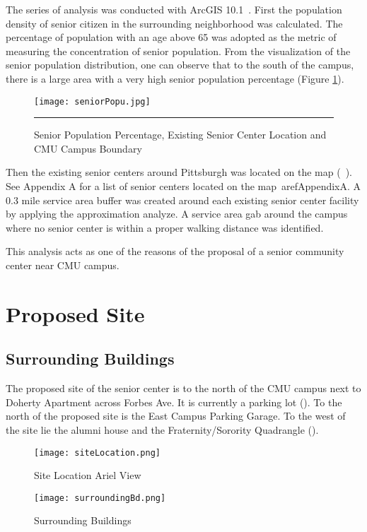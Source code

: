 The series of analysis was conducted with ArcGIS
10.1~\cite{ArcGIS}. First the population density of senior citizen in
the surrounding neighborhood was calculated. The percentage of
population with an age above 65 was adopted as the metric of measuring
the concentration of senior population\cite{WHO2015}. From the
visualization of the senior population distribution, one can observe
that to the south of the campus, there is a large area with a very
high senior population percentage (Figure \ref{fig:seniorPopu}).
\begin{figure}[htbp]
  \centering
  \texttt{[image: seniorPopu.jpg]}
  \rule{35em}{0.5pt}
  \caption[Near-campus Senior Population Density]{Senior Population
    Percentage, Existing Senior Center Location and CMU Campus
    Boundary}
  \label{fig:seniorPopu}
\end{figure}
Then the existing senior centers around Pittsburgh was located on the
map (~\cite{aging2013}). See Appendix A for a
list of senior centers located on the map~aref{AppendixA}. A 0.3 mile
service area buffer was created around each existing senior center
facility by applying the approximation analyze. A service area gab
around the campus where no senior center is within a proper walking
distance was identified.

This analysis acts as one of the reasons of the proposal of a senior
community center near CMU campus.

\section{Proposed Site}
\subsection{Surrounding Buildings}
The proposed site of the senior center is to the north of the CMU
campus next to Doherty Apartment across Forbes Ave. It is currently
a parking lot (). To the north of the proposed
site is the East Campus Parking Garage. To the west of the site lie
the alumni house and the Fraternity/Sorority Quadrangle ().
\begin{figure}[htbp]
  \centering
  \texttt{[image: siteLocation.png]}
  \caption[Site Location]{Site Location Ariel View~\cite{masterplan}}
  \label{fig:siteLocation}
\end{figure}
\begin{figure}[htbp]
  \centering
  \texttt{[image: surroundingBd.png]}
  \caption[Surrounding Buildings]{Surrounding
    Buildings~\cite{masterplan}}
  \label{fig:surroundingBd}
\end{figure}
